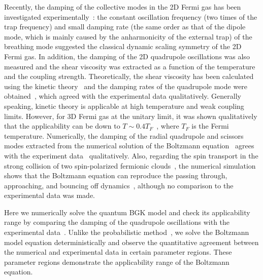 Recently, the damping of the collective modes in the 2D Fermi gas has been investigated experimentally~\cite{Vogt2012}: the constant oscillation frequency (two times of the trap frequency) and small damping rate (the same order as that of the dipole mode, which is mainly caused by the anharmonicity of the external trap) of the breathing mode suggested the classical dynamic scaling symmetry of the 2D Fermi gas. In addition, the damping of the 2D quadrupole oscillations was also measured and the shear viscosity was extracted as a function of the temperature and the coupling strength. Theoretically, the shear viscosity has been calculated using the kinetic theory~\cite{bruun_2012, arxiv_sch} and the damping rates of the quadrupole mode were obtained~\cite{bruun_2012}, which agreed with the experimental data qualitatively. Generally speaking, kinetic theory is applicable at high temperature and weak coupling limits. However, for 3D Fermi gas at the unitary limit, it was shown qualitatively that the applicability can be down to $T\sim0.4T_F$~\cite{Massignan2005}, where $T_F$ is the Fermi temperature. Numerically, the damping of the radial quadrupole and scissors modes extracted from the numerical solution of the Boltzmann equation~\cite{Lepers2010,Chiacchiera2011} agrees with the experiment data~\cite{Riedl2008} qualitatively. Also, regarding the spin transport in the strong collision of two spin-polarized fermionic clouds~\cite{Somme2011, Sommer2011b}, the numerical simulation shows that the Boltzmann equation can reproduce the passing through, approaching, and bouncing off dynamics~\cite{Goulko2011}, although no comparison to the experimental data was made.

Here we numerically solve the quantum BGK model and check its applicability range by comparing the damping of the quadrupole oscillations with the experimental data~\cite{Vogt2012}. Unlike the probabilistic method~\cite{Goulko2011}, we solve the Boltzmann model equation deterministically and observe the quantitative agreement between the numerical and experimental data in certain parameter regions. These parameter regions demonstrate the applicability range of the Boltzmann equation.

